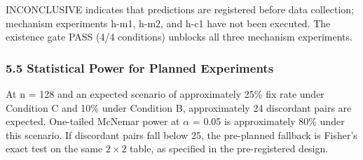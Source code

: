 \begin{table}[htbp]
\centering
{}
\end{table}

INCONCLUSIVE indicates that predictions are registered before data collection; mechanism experiments h-m1, h-m2, and h-c1 have not been executed. The existence gate PASS (4/4 conditions) unblocks all three mechanism experiments.

\subsubsection{5.5 Statistical Power for Planned Experiments}

At n = 128 and an expected scenario of approximately 25\% fix rate under Condition C and 10\% under Condition B, approximately 24 discordant pairs are expected. One-tailed McNemar power at $\alpha$ = 0.05 is approximately 80\% under this scenario. If discordant pairs fall below 25, the pre-planned fallback is Fisher's exact test on the same $2\times 2$ table, as specified in the pre-registered design.

